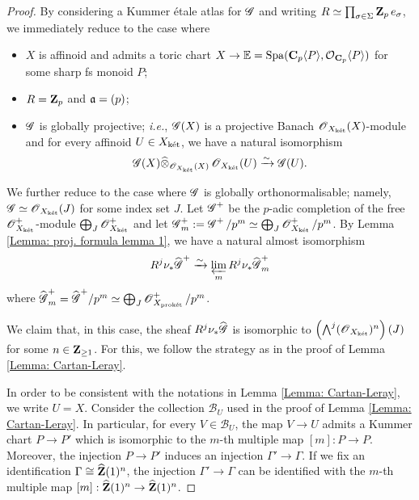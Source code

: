 \begin{proof}
By considering a Kummer \'etale atlas for $\operatorname{\mathscr{G}}$ and writing $R\simeq \prod_{\sigma\in \Sigma} \operatorname{\mathbf{Z}}_p e_{\sigma}$, we immediately reduce to the case where 
\begin{itemize}
\item $X$ is affinoid and admits a toric chart $X\rightarrow \mathbb{E}=\operatorname{Spa}(\operatorname{\mathbf{C}}_p\langle P\rangle, \operatorname{\mathcal{O}}_{\operatorname{\mathbf{C}}_p}\langle P\rangle)$ for some sharp fs monoid $P$; 
\item $R=\operatorname{\mathbf{Z}}_p$ and $\operatorname{\mathfrak{a}}=(p)$;
\item $\operatorname{\mathscr{G}}$ is globally projective; \emph{i.e.}, $\operatorname{\mathscr{G}}(X)$ is a projective Banach $\operatorname{\mathscr{O}}_{X_{\operatorname{\textrm{k\'{e}t}}}}(X)$-module and for every 
affinoid $U\in X_{\operatorname{\textrm{k\'{e}t}}}$, we have a natural isomorphism
\[\operatorname{\mathscr{G}}(X)\widehat{\otimes}_{\operatorname{\mathscr{O}}_{X_{\operatorname{\textrm{k\'{e}t}}}}(X)}\operatorname{\mathscr{O}}_{X_{\operatorname{\textrm{k\'{e}t}}}}(U)\xrightarrow[]{\sim} \operatorname{\mathscr{G}}(U).\]
\end{itemize}
We further reduce to the case where $\operatorname{\mathscr{G}}$ is globally orthonormalisable; namely, $\operatorname{\mathscr{G}}\simeq \operatorname{\mathscr{O}}_{X_{\operatorname{\textrm{k\'{e}t}}}}(J)$ for some index set $J$. Let $\operatorname{\mathscr{G}}^+$ be the $p$-adic completion of the free $\operatorname{\mathscr{O}}^+_{X_{\operatorname{\textrm{k\'{e}t}}}}$-module $\bigoplus_{J}\operatorname{\mathscr{O}}^+_{X_{\operatorname{\textrm{k\'{e}t}}}}$ and let $\operatorname{\mathscr{G}}^+_m:=\operatorname{\mathscr{G}}^+/p^m\simeq \bigoplus_{J} \operatorname{\mathscr{O}}^+_{X_{\operatorname{\textrm{k\'{e}t}}}}/p^m$. By Lemma \ref{Lemma: proj. formula lemma 1}, we have a natural almost isomorphism
$$R^j\nu_*\widehat{\operatorname{\mathscr{G}}}^+\xrightarrow[]{\sim} \varprojlim_m R^j \nu_*\widehat{\operatorname{\mathscr{G}}}^+_m$$
where $\widehat{\operatorname{\mathscr{G}}}^+_m=\widehat{\operatorname{\mathscr{G}}}^+/p^m\simeq \bigoplus_{J} \operatorname{\mathscr{O}}^+_{X_{\operatorname{\textrm{prok\'{e}t}}}}/p^m$.

We claim that, in this case, the sheaf $R^j\nu_*\widehat{\operatorname{\mathscr{G}}}$ is isomorphic to $\left(\bigwedge^j (\operatorname{\mathscr{O}}_{X_{\operatorname{\textrm{k\'{e}t}}}})^n\right)(J)$ for some $n\in \operatorname{\mathbf{Z}}_{\geq 1}$. For this, we follow the strategy as in the proof of Lemma \ref{Lemma: Cartan-Leray}.

In order to be consistent with the notations in Lemma \ref{Lemma: Cartan-Leray}, we write $U=X$. Consider the collection $\mathcal{B}_U$ used in the proof of Lemma \ref{Lemma: Cartan-Leray}. In particular, for every $V\in \mathcal{B}_U$, the map $V\rightarrow U$ admits a Kummer chart $P\rightarrow P'$ which is isomorphic to the $m$-th multiple map $[m]:P\rightarrow P$. Moreover, the injection $P\rightarrow P'$ induces an injection $\Gamma'\rightarrow \Gamma$. If we fix an identification $\Gamma\cong \widehat{\operatorname{\mathbf{Z}}}(1)^n$, the injection $\Gamma'\rightarrow \Gamma$ can be identified with the $m$-th multiple map $[m]:\widehat{\operatorname{\mathbf{Z}}}(1)^n\rightarrow \widehat{\operatorname{\mathbf{Z}}}(1)^n$.


\end{proof}

